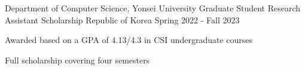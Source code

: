 

\begin{cventries}

  \cventry
    {Department of Computer Science, Yonsei University} %
    {Graduate Student Research Assistant Scholarship} %
    {Republic of Korea} %
    {Spring 2022 - Fall 2023} %
    {
      \begin{cvitems} %
        \item {Awarded based on a GPA of 4.13/4.3 in CSI undergraduate courses}
        \item {Full scholarship covering four semesters}
      \end{cvitems}
    }



\end{cventries}
